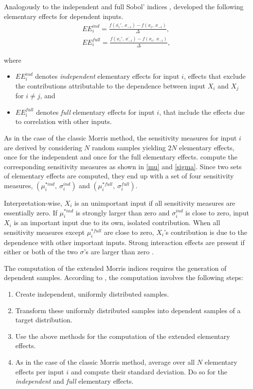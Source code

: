 Analogously to the independent and full Sobol' indices \citep{MTA15}, \citet{GM17} developed the following elementary effects for dependent inputs.
\begin{align}
EE_i^{ind} = \frac{f(\bar{x_i}',\ x_{-i}) - f(x_i,\ x_{-i})}{\Delta},\\
EE_i^{full} = \frac{f(x_i',\ \bar{x_{-i}}) - f(x_i,\ x_{-i})}{\Delta},
\end{align}

\noindent where
\begin{itemize}
\item $EE_i^{ind}$ denotes \textit{independent} elementary effects for input $i$, effects that exclude the contributions attributable to the dependence between input $X_i$ and $X_j$ for $i \neq j$, and
\item $EE_i^{full}$ denotes \textit{full} elementary effects for input $i$, that include the effects due to correlation with other inputs.
\end{itemize}

As in the case of the classic Morris method, the sensitivity measures for input $i$ are derived by considering $N$ random samples yielding $2 N$ elementary effects, once for the independent and once for the full elementary effects. \citet{GM17} compute the corresponding sensitivity measures as shown in \cref{mu} and \cref{sigma}. Since two sets of elementary effects are computed, they end up with a set of four sensitivity measures, $(\mu^{\ast ind}_i,\ \sigma_i^{ind})$ and $(\mu^{\ast full}_i,\ \sigma_i^{full})$.

Interpretation-wise, $X_i$ is an unimportant input if all sensitivity measures are essentially zero. If $\mu^{\ast ind}_i$ is strongly larger than zero and $\sigma_i^{ind}$ is close to zero, input $X_i$ is an important input due to its own, isolated contribution. When all sensitivity measures except $\mu^{\ast full}_i$ are close to zero, $X_i$'s contribution is due to the dependence with other important inputs. Strong interaction effects are present if either or both of the two $\sigma$'s are larger than zero \citep{GM17}.

The computation of the extended Morris indices requires the generation of dependent samples. According to \citet{GM17}, the computation involves the following steps:

\begin{enumerate}
    \item Create independent, uniformly distributed samples.
    \item Transform these uniformly distributed samples into dependent samples of a target distribution.
    \item Use the above methods for the computation of the extended elementary effects.
    \item As in the case of the classic Morris method, average over all $N$ elementary effects per input $i$ and compute their standard deviation. Do so for the \textit{independent} and \textit{full} elementary effects.
\end{enumerate}

